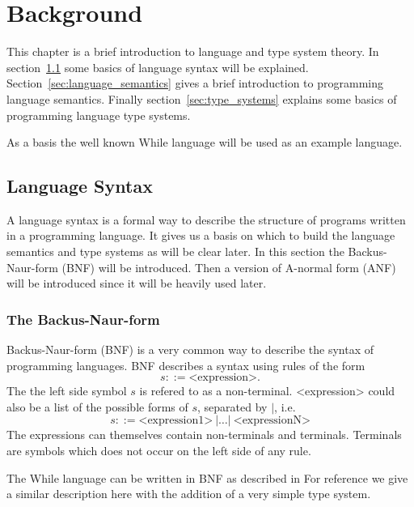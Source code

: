 \chapter{Background} \label{cha:background}

This chapter is a brief introduction to language and type system theory. In
section~\ref{sec:language_syntax} some basics of language syntax will be
explained. Section~\ref{sec:language_semantics} gives a brief introduction to
programming language semantics. Finally section~\ref{sec:type_systems} explains
some basics of programming language type systems.

As a basis the well known While language will be used as an example language.

\section{Language Syntax} \label{sec:language_syntax}

A language syntax is a formal way to describe the structure of programs written
in a programming language. It gives us a basis on which to build the language
semantics and type systems as will be clear later. In this section the
Backus-Naur-form (BNF) will be introduced. Then a version of A-normal form (ANF) will be
introduced since it will be heavily used later.

\subsection{The Backus-Naur-form} \label{sub:the_backus_naur_form} 

Backus-Naur-form (BNF) is a very common way to describe the syntax of
programming languages. BNF describes a syntax using rules of the form
\begin{equation*}
  s ::= \text{<expression>}.
\end{equation*}
The the left side symbol $s$ is refered to as a non-terminal. <expression> could
also be a list of the
possible forms of $s$, separated by $|$, i.e. 
\begin{equation*}
  s ::= \text{<expression1>} \: | \dots | \: \text{<expressionN>}
\end{equation*}
The expressions can themselves contain non-terminals and terminals.
Terminals are symbols which does not occur on the left side of any rule.

The While language can be written in BNF as described in %
For reference we give a similar description here with the addition of a very
simple type system.

